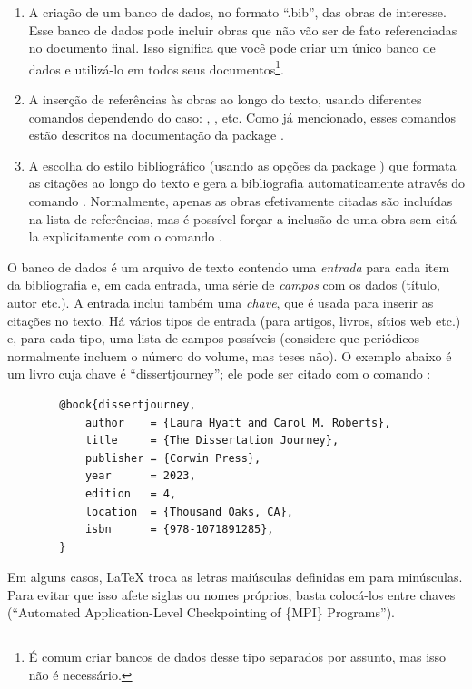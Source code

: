 \begin{enumerate}
\item A criação de um banco de dados, no formato ``.bib'', das obras de
interesse. Esse banco de dados pode incluir obras que não vão ser de fato
referenciadas no documento final. Isso significa que você pode criar um
único banco de dados e utilizá-lo em todos seus documentos\footnote{É
comum criar bancos de dados desse tipo separados por assunto, mas isso
não é necessário.}.

\item A inserção de referências às obras ao longo do texto, usando
diferentes comandos dependendo do caso: , ,
 etc. Como já mencionado, esses comandos estão descritos
na documentação da package  \citep{natbib}.

\item A escolha do estilo bibliográfico (usando as opções da package
) que formata as citações ao longo do texto e gera a bibliografia
automaticamente através do comando . Normalmente,
apenas as obras efetivamente citadas são incluídas na lista de referências,
mas é possível forçar a inclusão de uma obra sem citá-la explicitamente com
o comando .
\end{enumerate}

O banco de dados é um arquivo de texto contendo uma \emph{entrada} para cada
item da bibliografia e, em cada entrada, uma série de \emph{campos} com os
dados (título, autor etc.). A entrada inclui também uma \emph{chave}, que é
usada para inserir as citações no texto. Há vários tipos de entrada (para
artigos, livros, sítios web etc.) e, para cada tipo, uma lista de campos
possíveis (considere que periódicos normalmente incluem o número do volume,
mas teses não). O exemplo abaixo é um livro cuja chave é ``dissertjourney'';
ele pode ser citado com o comando :

\begin{verbatim}
        @book{dissertjourney,
            author    = {Laura Hyatt and Carol M. Roberts},
            title     = {The Dissertation Journey},
            publisher = {Corwin Press},
            year      = 2023,
            edition   = 4,
            location  = {Thousand Oaks, CA},
            isbn      = {978-1071891285},
        }
\end{verbatim}

Em alguns casos, \LaTeX{} troca as letras maiúsculas definidas em
 para minúsculas. Para evitar que isso afete siglas
ou nomes próprios, basta colocá-los entre chaves (``Automated
Application-Level Checkpointing of \{MPI\} Programs'').

